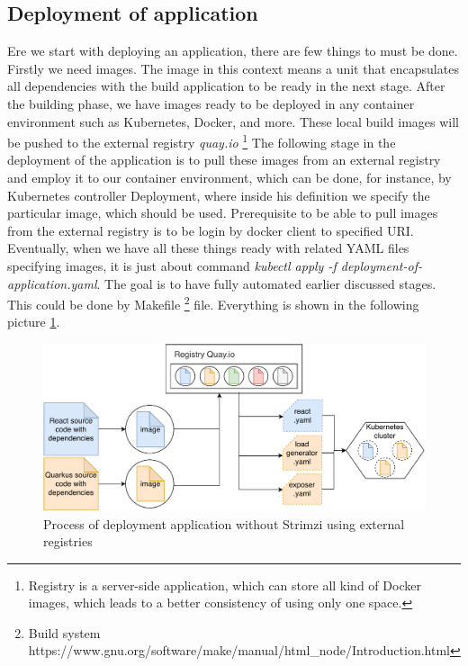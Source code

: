 \documentclass{ExcelAtFIT}
\begin{document}
\subsection{Deployment of application}

Ere we start with deploying an application, there are few things to must be done. Firstly we need images. The image in this context means a unit that encapsulates all dependencies with the build application to be ready in the next stage.  After the building phase, we have images ready to be deployed in any container environment such as Kubernetes, Docker, and more.  These local build images will be pushed to the external registry \emph{quay.io} \footnote{Registry is a server-side application, which can store all kind of Docker images, which leads to a better consistency of using only one space.} The following stage in the deployment of the application is to pull these images from an external registry and employ it to our container environment, which can be done, for instance, by Kubernetes controller Deployment, where inside his definition we specify the particular image, which should be used. Prerequisite to be able to pull images from the external registry is to be login by docker client to specified URI. Eventually, when we have all these things ready with related YAML files specifying images, it is just about command \emph{kubectl apply -f deployment-of-application.yaml}. The goal is to have fully automated earlier discussed stages. This could be done by Makefile \footnote{Build system  https://www.gnu.org/software/make/manual/html_node/Introduction.html} file. Everything is shown in the following picture \ref{fig:externalSystem:applicationProcess}.

\begin{figure}[h!t]
	\centering
	\includegraphics[width=1\linewidth]{images/03-externalSystem/deploymentOfApp.pdf}
	\caption{Process of deployment application without Strimzi using external registries}
	\label{fig:externalSystem:applicationProcess}
\end{figure}
\end{document}
